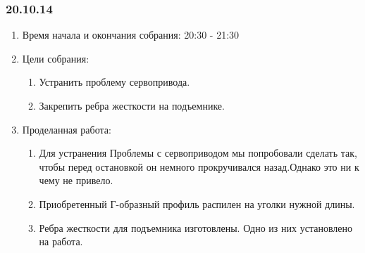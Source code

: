 	
\subsubsection{20.10.14}

\begin{enumerate}
	\item Время начала и окончания собрания:
	20:30 - 21:30
	\item Цели собрания:
	\begin{enumerate}
	  \item Устранить проблему сервопривода.
	  
	  \item Закрепить ребра жесткости на подъемнике.
	  
    \end{enumerate}
    
	\item Проделанная работа:
	\begin{enumerate}
	  \item Для устранения Проблемы с сервоприводом мы попробовали сделать так, чтобы перед остановкой он немного прокручивался назад.Однако это ни к чему не привело.
      
      \item Приобретенный Г-образный профиль распилен на уголки нужной длины.
      
      \item Ребра жесткости для подъемника изготовлены. Одно из них установлено на работа.
      

\end{enumerate}
\end{enumerate}
